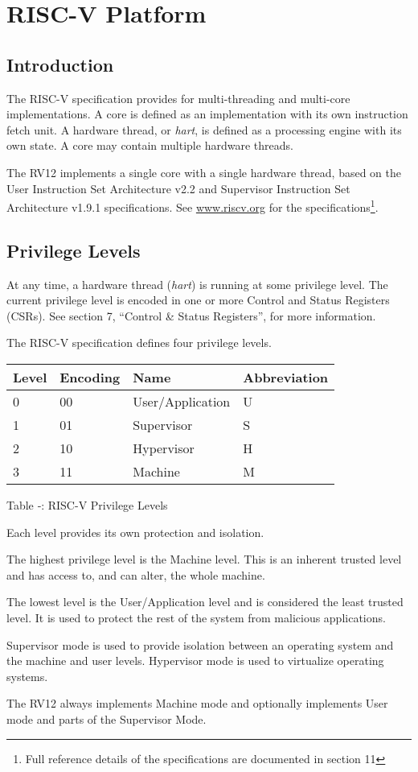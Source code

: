 \section{RISC-V Platform}\label{risc-v-platform}

\subsection{Introduction}\label{introduction-2}

The RISC-V specification provides for multi-threading and multi-core
implementations. A core is defined as an implementation with its own
instruction fetch unit. A hardware thread, or \emph{hart}, is defined as
a processing engine with its own state. A core may contain multiple
hardware threads.

The RV12 implements a single core with a single hardware thread, based
on the User Instruction Set Architecture v2.2 and Supervisor Instruction
Set Architecture v1.9.1 specifications. See
\href{http://www.riscv.org}{www.riscv.org} for the
specifications\footnote{Full reference details of the specifications are
  documented in section 11}.

\subsection{Privilege Levels}\label{privilege-levels}

At any time, a hardware thread (\emph{hart}) is running at some
privilege level. The current privilege level is encoded in one or more
Control and Status Registers (CSRs). See section 7, ``Control \& Status
Registers'', for more information.

The RISC-V specification defines four privilege levels.

\begin{longtable}[]{@{}llll@{}}
\toprule
Level & Encoding & Name & Abbreviation\tabularnewline
\midrule
\endhead
0 & 00 & User/Application & U\tabularnewline
1 & 01 & Supervisor & S\tabularnewline
2 & 10 & Hypervisor & H\tabularnewline
3 & 11 & Machine & M\tabularnewline
\bottomrule
\end{longtable}

Table ‑: RISC-V Privilege Levels

Each level provides its own protection and isolation.

The highest privilege level is the Machine level. This is an inherent
trusted level and has access to, and can alter, the whole machine.

The lowest level is the User/Application level and is considered the
least trusted level. It is used to protect the rest of the system from
malicious applications.

Supervisor mode is used to provide isolation between an operating system
and the machine and user levels. Hypervisor mode is used to virtualize
operating systems.

The RV12 always implements Machine mode and optionally implements User
mode
an\protect\hypertarget{_Toc326677752}{}{\protect\hypertarget{_Ref326824571}{}{}}d
parts of the Supervisor Mode.
